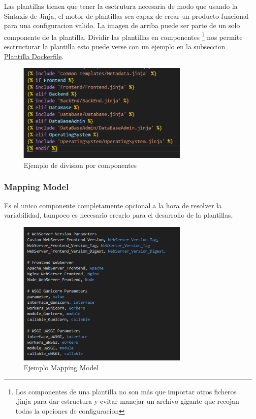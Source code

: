 \documentclass[12pt, a4paper, twoside]{article}
\begin{document}
Las plantillas tienen que tener la esctrutura necesaria de modo que usando la Sintaxis de Jinja, el motor de plantillas sea capaz de crear un producto funcional para una configuracion valido. La imagen de arriba puede ser parte de un solo componente de la plantilla.
Dividir las plantillas en componentes \footnote{Los componentes de una plantilla no son más que importar otros ficheros .jinja para dar estructura y evitar manejar un archivo gigante que recojan todas la opciones de configuracion} nos permite esctructurar la plantilla esto puede verse con un ejemplo en la subseccion \hyperref[sec:Plantilla dockerfile]{Plantilla Dockerfile}.

\begin{figure}[h]
	\centering
		\includegraphics[width=0.75\textwidth]{dockerfile.logica.plantillas.jinja.png}
	\caption{Ejemplo de division por componentes}
\end{figure}


\newpage
\subsubsection{Mapping Model}
\label{sec:Mapping Model}
Es el unico componente completamente opcional a la hora de resolver la variabilidad, tampoco es necesario crearlo para el desarrollo de la plantillas.

\begin{figure}[h]
	\centering
		\includegraphics[width=0.75\textwidth]{mapping_model_screenshot.png}
	\caption{Ejemplo Mapping Model}
\end{figure}
\end{document}
